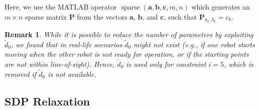 \documentclass[journal]{IEEEtran}
\newtheorem{rem}{Remark}[section]
\begin{document}
Here, we use the MATLAB operator $\operatorname{sparse}(\mathbf{a},\mathbf{b},\mathbf{c},m,n)$ which generates an $m \times n$ sparse matrix $\mathbf{P}$ from the vectors $\mathbf{a}$, $\mathbf{b}$, and $\mathbf{c}$, such that $\mathbf{P}_{a_k,b_k} = c_k$.

\begin{rem}\label{rem:SD_WLS_d0}
While it is possible to reduce the number of parameters by exploiting $\tilde{d}_0$\cite{li2020relSDP}, we found that in real-life scenarios $\tilde{d}_0$ might not exist (e.g., if one robot starts moving when the other robot is not ready for operation, or if the starting points are not within line-of-sight). Hence, $\tilde{d}_0$ is used only for constraint $i{=}5$, which is removed if $\tilde{d}_0$ is not available.
\end{rem}

\subsection{SDP Relaxation} \label{subsec:main_approaches_SDP}
\end{document}
